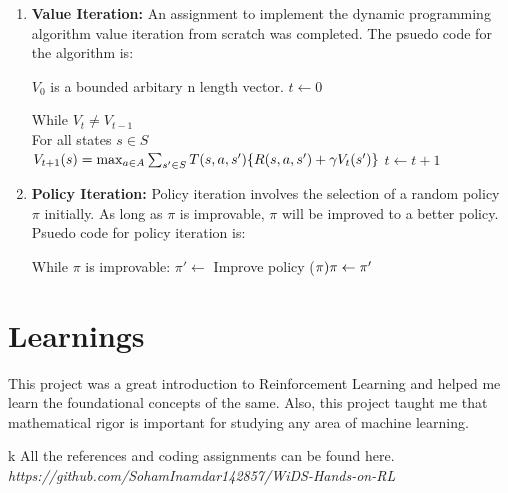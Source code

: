 \documentclass[12pt]{article}
\begin{document}
\begin{enumerate}
    \item \textbf{Value Iteration:} An assignment to implement the dynamic programming algorithm value iteration from scratch was completed. The psuedo code for the algorithm is:

    
$V_0$ is a bounded arbitary n length vector.
\newline
$t \leftarrow 0$ 


While $V_t \neq V_{t-1}$ \\
For all states $s \in S$\\
$V_{t+1}(s)=\max_{a\in A}\sum_{s'\in S}T(s,a,s')\{R(s,a,s')+\gamma V_t(s')\}\\$
$t \leftarrow t+1$
\item \textbf{Policy Iteration:}
Policy iteration involves the selection of a random policy $\pi$ initially. As long as $\pi$ is improvable, $\pi$ will be improved to a better policy. Psuedo code for policy iteration is:


While $\pi$ is improvable:
 $\pi '\leftarrow$ Improve policy
 ($\pi) \\
 \pi \leftarrow \pi '$
\end{enumerate}


\section{Learnings}
This project was a great introduction to Reinforcement Learning and helped me learn the foundational concepts of the same. Also, this project taught me that  mathematical rigor is important for studying any area of machine learning.


 





\begin{thebibliography}{99}


\bibitem k
All the references and coding assignments can be found here.
{\em https://github.com/SohamInamdar142857/WiDS-Hands-on-RL}
%
%

\end{thebibliography}




  
\end{document}
